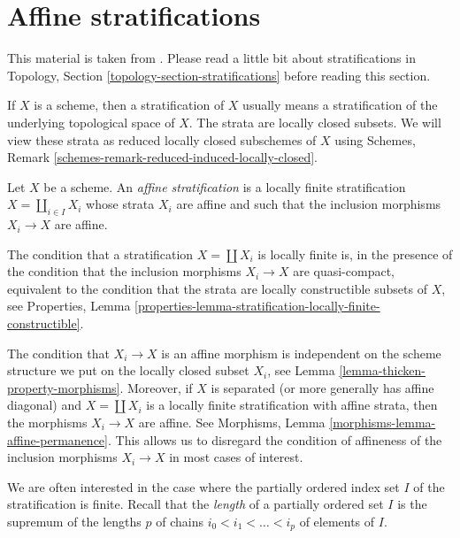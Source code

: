 \section{Affine stratifications}
\label{section-affine-stratifications}

\noindent
This material is taken from \cite{RV}. Please read a little bit
about stratifications in
Topology, Section \ref{topology-section-stratifications}
before reading this section.

\medskip\noindent
If $X$ is a scheme, then a stratification of $X$ usually means a
stratification of the underlying topological space of $X$.
The strata are locally closed subsets. We will view these
strata as reduced locally closed subschemes of $X$ using
Schemes, Remark \ref{schemes-remark-reduced-induced-locally-closed}.

\begin{definition}
\label{definition-affine-stratification}
Let $X$ be a scheme. An {\it affine stratification} is a
locally finite stratification $X = \coprod_{i \in I} X_i$
whose strata $X_i$ are affine and such that
the inclusion morphisms $X_i \to X$ are affine.
\end{definition}

\noindent
The condition that a stratification $X = \coprod X_i$ is locally finite is,
in the presence of the condition that the inclusion morphisms $X_i \to X$
are quasi-compact, equivalent to the condition that the strata are locally
constructible subsets of $X$, see Properties, Lemma
\ref{properties-lemma-stratification-locally-finite-constructible}.

\medskip\noindent
The condition that $X_i \to X$ is an affine morphism is independent
on the scheme structure we put on the locally closed subset $X_i$, see
Lemma \ref{lemma-thicken-property-morphisms}. Moreover,
if $X$ is separated (or more generally has affine diagonal) and
$X = \coprod X_i$ is a locally finite stratification with affine strata,
then the morphisms $X_i \to X$ are affine. See
Morphisms, Lemma \ref{morphisms-lemma-affine-permanence}.
This allows us to disregard the condition of affineness of the
inclusion morphisms $X_i \to X$ in most cases of interest.

\medskip\noindent
We are often interested in the case where the partially ordered index set $I$
of the stratification is finite. Recall that the {\it length} of a
partially ordered set $I$ is the supremum of the lengths $p$ of
chains $i_0 < i_1 < \ldots < i_p$ of elements of $I$.

